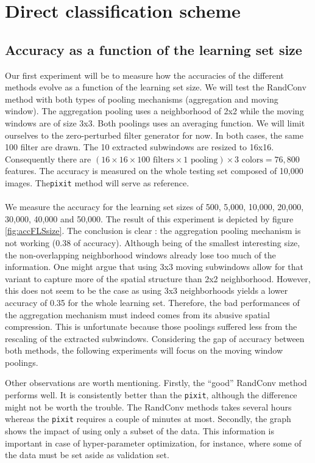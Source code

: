 \documentclass[a4paper]{report}
\begin{document}
	\section{Direct classification scheme}
	
		\subsection{Accuracy as a function of the learning set size}
		Our first experiment will be to measure how the accuracies of the different methods evolve as a function of the learning set size. We will test the RandConv method with both types of pooling mechanisms (aggregation and moving window). The aggregation pooling uses a neighborhood of 2x2 while the moving windows are of size 3x3. Both poolings uses an averaging function. We will limit ourselves to the zero-perturbed filter generator for now. In both cases, the same 100 filter are drawn. The 10 extracted subwindows are resized to 16x16. Consequently there are $(16 \times 16 \times 100 \text{ filters} \times 1 \text{ pooling})\times 3 \text{ colors} = 76,800$ features. The accuracy is measured on the whole testing set composed of 10,000 images. The\texttt{pixit} method will serve as reference.
		\paragraph{}
		We measure the accuracy for the learning set sizes of 500, 5,000, 10,000, 20,000, 30,000, 40,000 and 50,000. The result of this experiment is depicted by figure \ref{fig:accFLSsize}. The conclusion is clear : the aggregation pooling mechanism is not working (0.38 of accuracy). Although being of the smallest interesting size, the non-overlapping neighborhood windows already lose too much of the information. One might argue that using 3x3 moving subwindows allow for that variant to capture more of the spatial structure than 2x2 neighborhood. However, this does not seem to be the case as using 3x3 neighborhoods yields a lower accuracy of 0.35 for the whole learning set. Therefore, the bad performances of the aggregation mechanism must indeed comes from its abusive spatial compression. This is unfortunate because those poolings suffered less from the rescaling of the extracted subwindows. Considering the gap of accuracy between both methods, the following experiments will focus on the moving window poolings.
		\par
		Other observations are worth mentioning. Firstly, the ``good'' RandConv method performs well. It is consistently better than the \texttt{pixit}, although the difference might not be worth the trouble. The RandConv methods takes several hours whereas the \texttt{pixit} requires a couple of minutes at most. 
		Secondly, the graph shows the impact of using only a subset of the data. This information is important in case of hyper-parameter optimization, for instance, where some of the data must be set aside as validation set.
		
\end{document}
